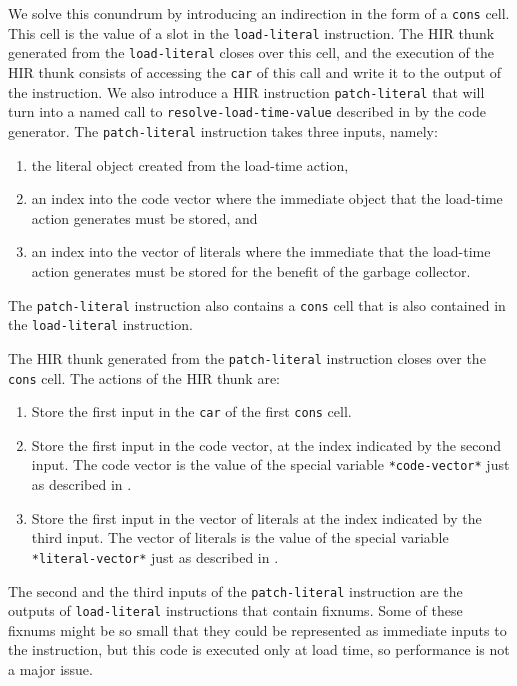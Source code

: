 We solve this conundrum by introducing an indirection in the form of a
\texttt{cons} cell.  This cell is the value of a slot in the
\texttt{load-literal} instruction.  The HIR thunk generated from the
\texttt{load-literal} closes over this cell, and the execution of the
HIR thunk consists of accessing the \texttt{car} of this call and
write it to the output of the instruction.  We also introduce a HIR
instruction \texttt{patch-literal} that will turn into a named call to
\texttt{resolve-load-time-value} described in
 by the code generator.  The
\texttt{patch-literal} instruction takes three inputs, namely:

\begin{enumerate}
\item the literal object created from the load-time action,
\item an index into the code vector where the immediate object that
  the load-time action generates must be stored, and
\item an index into the vector of literals where the immediate that
  the load-time action generates must be stored for the benefit of
  the garbage collector.
\end{enumerate}

The \texttt{patch-literal} instruction also contains a \texttt{cons}
cell that is also contained in the \texttt{load-literal} instruction.

The HIR thunk generated from the \texttt{patch-literal} instruction
closes over the \texttt{cons} cell.  The actions of the HIR thunk are:

\begin{enumerate}
\item Store the first input in the \texttt{car} of the first
  \texttt{cons} cell.
\item Store the first input in the code vector, at the index indicated
  by the second input.  The code vector is the value of the special
  variable \texttt{*code-vector*} just as described in
  .
\item Store the first input in the vector of literals at the index
  indicated by the third input.  The vector of literals is the value
  of the special variable \texttt{*literal-vector*} just as described
  in .
\end{enumerate}

The second and the third inputs of the \texttt{patch-literal}
instruction are the outputs of \texttt{load-literal} instructions that
contain fixnums.  Some of these fixnums might be so small that they
could be represented as immediate inputs to the instruction, but this
code is executed only at load time, so performance is not a major
issue. 

